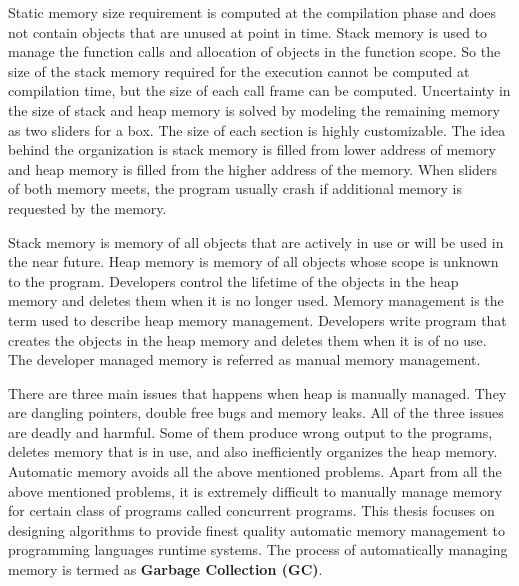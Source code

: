 Static memory size requirement is computed at the compilation phase and does not contain objects that are unused at point in time. Stack memory is used to manage the function calls and allocation of objects in the function scope. So the size of the stack memory required for the execution cannot be computed at compilation time, but the size of each call frame can be computed. Uncertainty in the size of stack and heap memory is solved by modeling the remaining memory as two sliders for a box. The size of each section is highly customizable. The idea behind the organization is stack memory is filled from lower address of memory and heap memory is filled from the higher address of the memory. When sliders of both memory meets, the program usually crash if additional memory is requested by the memory. 

Stack memory is memory of all objects that are actively in use or will be used in the near future. Heap memory is memory of all objects whose scope is unknown to the program. Developers control the lifetime of the objects in the heap memory and deletes them when it is no longer used. Memory management is the term used to describe heap memory management. Developers write program that creates the objects in the heap memory and deletes them when it is of no use. The developer managed memory is referred as manual memory management. 

 There are three main issues that happens when heap is manually managed. They are dangling pointers, double free bugs and memory leaks. All of the three issues are deadly and harmful. Some of them produce wrong output to the programs, deletes memory that is in use, and also inefficiently organizes the heap memory. Automatic memory avoids all the above mentioned problems. Apart from all the above mentioned problems, it is extremely difficult to manually manage memory for certain class of programs called concurrent programs. This thesis focuses on designing algorithms to provide finest quality automatic memory management to programming languages runtime systems. The process of automatically managing memory is termed as \textbf{Garbage Collection (GC)}.
\begin{comment}
Heap memory helps developer to extend the life of dynamically allocated objects. Some object allocated in the heap might get very long life as long as the life of the program running. So these objects have infinite life if programmer did not delete them after their last use. The unwanted objects in the heap occupies the heap memory and might make application run out of memory and exit. In order to avoid psuedo full heap memory errors, programmers determine the life of the dynamically allocated objects and delete them. The dynamically allocated objects can be accessed only by pointers in the static and stack memory. These pointers are also called as \textbf{roots}.
\end{comment}
